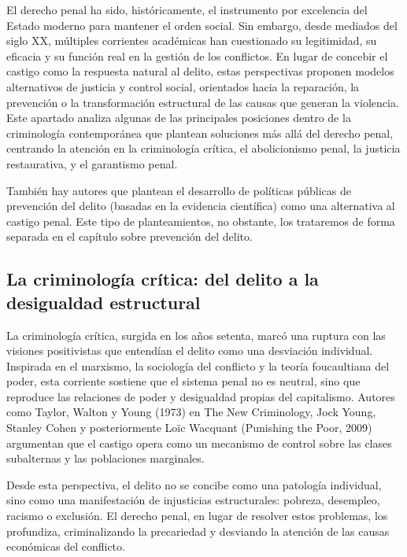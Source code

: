 \documentclass[
  spanish,
  letterpaper,
  DIV=11,
  numbers=noendperiod]{scrreprt}
\begin{document}
El derecho penal ha sido, históricamente, el instrumento por excelencia
del Estado moderno para mantener el orden social. Sin embargo, desde
mediados del siglo XX, múltiples corrientes académicas han cuestionado
su legitimidad, su eficacia y su función real en la gestión de los
conflictos. En lugar de concebir el castigo como la respuesta natural al
delito, estas perspectivas proponen modelos alternativos de justicia y
control social, orientados hacia la reparación, la prevención o la
transformación estructural de las causas que generan la violencia. Este
apartado analiza algunas de las principales posiciones dentro de la
criminología contemporánea que plantean soluciones más allá del derecho
penal, centrando la atención en la criminología crítica, el
abolicionismo penal, la justicia restaurativa, y el garantismo penal.

También hay autores que plantean el desarrollo de políticas públicas de
prevención del delito (basadas en la evidencia científica) como una
alternativa al castigo penal. Este tipo de planteamientos, no obstante,
los trataremos de forma separada en el capítulo sobre prevención del
delito.

\subsection{La criminología crítica: del delito a la desigualdad
estructural}\label{la-criminologuxeda-cruxedtica-del-delito-a-la-desigualdad-estructural}

La criminología crítica, surgida en los años setenta, marcó una ruptura
con las visiones positivistas que entendían el delito como una
desviación individual. Inspirada en el marxismo, la sociología del
conflicto y la teoría foucaultiana del poder, esta corriente sostiene
que el sistema penal no es neutral, sino que reproduce las relaciones de
poder y desigualdad propias del capitalismo. Autores como Taylor, Walton
y Young (1973) en The New Criminology, Jock Young, Stanley Cohen y
posteriormente Loïc Wacquant (Punishing the Poor, 2009) argumentan que
el castigo opera como un mecanismo de control sobre las clases
subalternas y las poblaciones marginales.

Desde esta perspectiva, el delito no se concibe como una patología
individual, sino como una manifestación de injusticias estructurales:
pobreza, desempleo, racismo o exclusión. El derecho penal, en lugar de
resolver estos problemas, los profundiza, criminalizando la precariedad
y desviando la atención de las causas económicas del conflicto.
\end{document}
